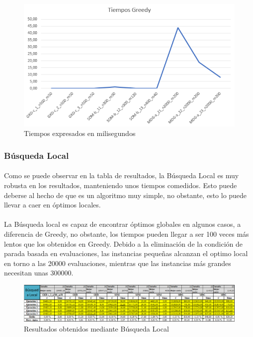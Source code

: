 \documentclass{article}
\begin{document}
			\begin{figure}[H]
				
				\centering
				\includegraphics[scale=0.4]{img/TiemposGreedy}
				\caption{Tiempos expresados en milisegundos}
				
			\end{figure}
		
		\subsubsection{Búsqueda Local}
		
				\paragraph{}Como se puede observar en la tabla de resultados, la Búsqueda Local es muy robusta en los resultados, manteniendo unos tiempos comedidos. Esto puede deberse al hecho de que es un algoritmo muy simple, no obstante, esto lo puede llevar a caer en óptimos locales.
				
			 \paragraph{}La Búsqueda local es capaz de encontrar óptimos globales en algunos casos, a diferencia de Greedy, no obstante, los tiempos pueden llegar a ser 100 veces más lentos que los obtenidos en Greedy. Debido a la eliminación de la condición de parada basada en evaluaciones, las instancias pequeñas alcanzan el optimo local en torno a las 20000 evaluaciones, mientras que las instancias más grandes necesitan unas 300000.
				
			\begin{figure}[H]
				
				\centering
				\includegraphics[scale=0.4]{img/blocalResult}
				\caption{Resultados obtenidos mediante Búsqueda Local}
				
			\end{figure}
		
\end{document}
